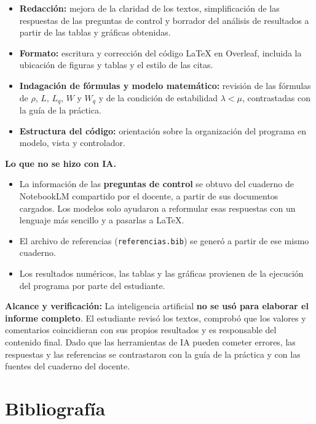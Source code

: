 \documentclass[11pt,a4paper]{article}
\begin{document}
\begin{itemize}
    \item \textbf{Redacción:} mejora de la claridad de los textos, simplificación de las
    respuestas de las preguntas de control y borrador del análisis de resultados a
    partir de las tablas y gráficas obtenidas.
    \item \textbf{Formato:} escritura y corrección del código \LaTeX{} en Overleaf,
    incluida la ubicación de figuras y tablas y el estilo de las citas.
    \item \textbf{Indagación de fórmulas y modelo matemático:} revisión de las fórmulas
    de $\rho$, $L$, $L_q$, $W$ y $W_q$ y de la condición de estabilidad $\lambda < \mu$,
    contrastadas con la guía de la práctica.
    \item \textbf{Estructura del código:} orientación sobre la organización del programa
    en modelo, vista y controlador.
\end{itemize}

\textbf{Lo que no se hizo con IA.}

\begin{itemize}
    \item La información de las \textbf{preguntas de control} se obtuvo del cuaderno de
    NotebookLM compartido por el docente, a partir de sus documentos cargados. Los
    modelos solo ayudaron a reformular esas respuestas con un lenguaje más sencillo y a
    pasarlas a \LaTeX{}.
    \item El archivo de referencias (\texttt{referencias.bib}) se generó a partir de
    ese mismo cuaderno.
    \item Los resultados numéricos, las tablas y las gráficas provienen de la ejecución
    del programa por parte del estudiante.
\end{itemize}

\textbf{Alcance y verificación:} La inteligencia artificial \textbf{no se usó para
elaborar el informe completo}. El estudiante revisó los textos, comprobó que los valores
y comentarios coincidieran con sus propios resultados y es responsable del contenido
final. Dado que las herramientas de IA pueden cometer errores, las respuestas y las
referencias se contrastaron con la guía de la práctica y con las fuentes del cuaderno
del docente.

\section{Bibliografía}



\end{document}
